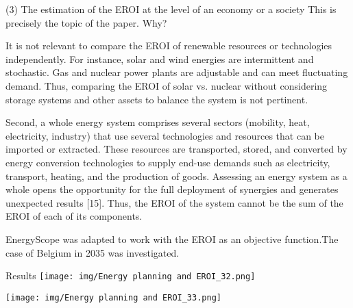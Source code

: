 \begin{frame}{(3) The estimation of the EROI at the level of an economy
or a society}
\label{the-estimation-of-the-eroi-at-the-level-of-an-economy-or-a-society}
This is precisely the topic of the paper. Why?

It is not relevant to compare the EROI of renewable resources or
technologies independently. For instance, solar and wind energies are
intermittent and stochastic. Gas and nuclear power plants are adjustable
and can meet fluctuating demand. Thus, comparing the EROI of solar vs.
nuclear without considering storage systems and other assets to balance
the system is not pertinent.

Second, a whole energy system comprises several sectors (mobility, heat,
electricity, industry) that use several technologies and resources that
can be imported or extracted. These resources are transported, stored,
and converted by energy conversion technologies to supply end-use
demands such as electricity, transport, heating, and the production of
goods. Assessing an energy system as a whole opens the opportunity for
the full deployment of synergies and generates unexpected results
{[}15{]}. Thus, the EROI of the system cannot be the sum of the EROI of
each of its components.

EnergyScope was adapted to work with the EROI as an objective
function.The case of Belgium in 2035 was investigated.
\end{frame}

\begin{frame}{Results}
\label{results}
\texttt{[image: img/Energy planning and EROI\_32.png]}

\texttt{[image: img/Energy planning and EROI\_33.png]}
\end{frame}
